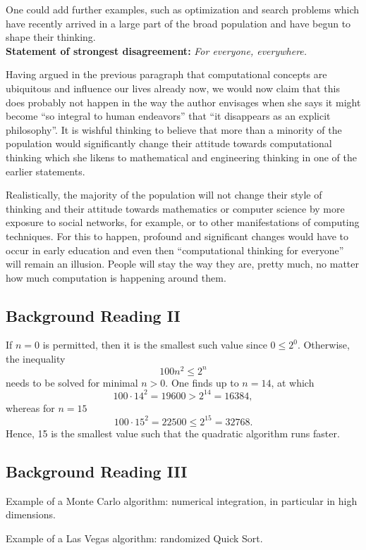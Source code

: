 \documentclass[a4paper]{article}
\begin{document}
One could add further examples, such as optimization and search
problems which have recently arrived in a large part of the broad population and
have begun to shape their thinking.
\\

{\bf Statement of strongest disagreement:} {\it For everyone, everywhere.}

Having argued in the previous paragraph that computational concepts are
ubiquitous and influence our lives already now, we would now claim that this
does probably not happen in the way the author envisages when she says
it might become ``so integral to human
endeavors'' that ``it disappears as an explicit philosophy''. It is wishful
thinking to believe that more than a minority of the population would
significantly change their attitude towards computational thinking which she
likens to mathematical and engineering thinking in one of the earlier
statements.

Realistically, the majority of the population will not change their style of
thinking and their attitude towards mathematics or computer science by more
exposure to social networks, for example, or to other manifestations of
computing techniques. For this to happen, profound and significant changes would have to
occur in early education and even then ``computational thinking for everyone''
will remain an illusion. People will stay the way they are, pretty much, no
matter how much computation is happening around them.

\subsection{Background Reading II}

If $n=0$ is permitted, then it is the smallest such value since $0\leq 2^0$.
Otherwise, the inequality
\begin{equation}
100 n^2 \leq 2^n
\end{equation}
needs to be solved for minimal $n>0$. One finds up to $n=14$, at which
\begin{equation}
100 \cdot 14^2 = 19600 > 2^{14} = 16384,
\end{equation}
whereas for $n=15$
\begin{equation}
100 \cdot 15^2 = 22500 \leq 2^{15}= 32768.
\end{equation}
Hence, 15 is the smallest value such that the quadratic algorithm runs faster.

\subsection{Background Reading III}

Example of a Monte Carlo algorithm: numerical integration, in particular in high
dimensions.

\noindent Example of a Las Vegas algorithm: randomized Quick Sort.
\end{document}
